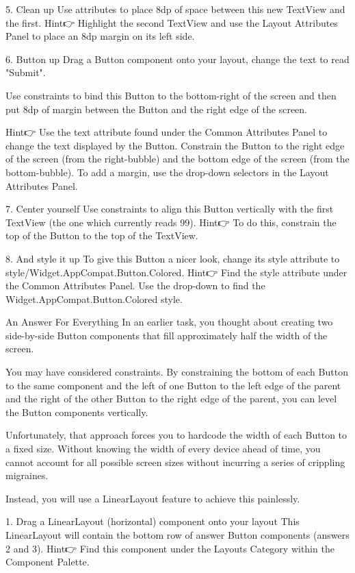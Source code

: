     5. Clean up
        Use attributes to place 8dp of space between this new TextView and the first.
        Hint👉 Highlight the second TextView and use the Layout Attributes Panel to place an 8dp margin on its left side.

    6. Button up
        Drag a Button component onto your layout, change the text to read "Submit".

        Use constraints to bind this Button to the bottom-right of the screen and then put 8dp of margin between the Button and the right edge of the screen.

        Hint👉 Use the text attribute found under the Common Attributes Panel to change the text displayed by the Button.
        Constrain the Button to the right edge of the screen (from the right-bubble) and the bottom edge of the screen (from the bottom-bubble).
        To add a margin, use the drop-down selectors in the Layout Attributes Panel.

    7. Center yourself
        Use constraints to align this Button vertically with the first TextView (the one which currently reads 99).
        Hint👉 To do this, constrain the top of the Button to the top of the TextView.

    8. And style it up
        To give this Button a nicer look, change its style attribute to style/Widget.AppCompat.Button.Colored.
        Hint👉 Find the style attribute under the Common Attributes Panel. Use the drop-down to find the Widget.AppCompat.Button.Colored style.

An Answer For Everything
        In an earlier task, you thought about creating two side-by-side Button components that fill approximately half the width of the screen.

        You may have considered constraints. By constraining the bottom of each Button to the same component and the left of one Button to the left edge of the parent and the right of the other Button to the right edge of the parent, you can level the Button components vertically.

        Unfortunately, that approach forces you to hardcode the width of each Button to a fixed size. Without knowing the width of every device ahead of time, you cannot account for all possible screen sizes without incurring a series of crippling migraines.

        Instead, you will use a LinearLayout feature to achieve this painlessly.

    1. Drag a LinearLayout (horizontal) component onto your layout
        This LinearLayout will contain the bottom row of answer Button components (answers 2 and 3).
        Hint👉 Find this component under the Layouts Category within the Component Palette.

